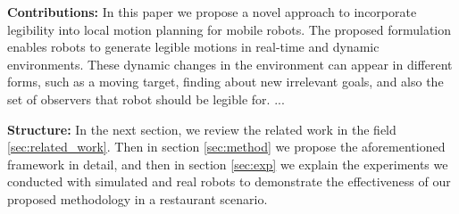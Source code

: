 
\vspace{0.3cm}
\textbf{Contributions:} In this paper we propose a novel approach to incorporate legibility into local motion planning for mobile robots.
The proposed formulation enables robots to generate legible motions in real-time and dynamic environments.
These dynamic changes in the environment can appear in different forms, such as a moving target, finding about new irrelevant goals,
and also the set of observers that robot should be legible for.
...

\vspace{0.3cm}
\textbf{Structure:}
%
In the next section, we review the related work in the field \ref{sec:related_work}.
Then in section \ref{sec:method} we propose the aforementioned framework in detail,
and then in section \ref{sec:exp} we explain the experiments we conducted with simulated and real robots to demonstrate the effectiveness of our proposed methodology in a restaurant scenario.

